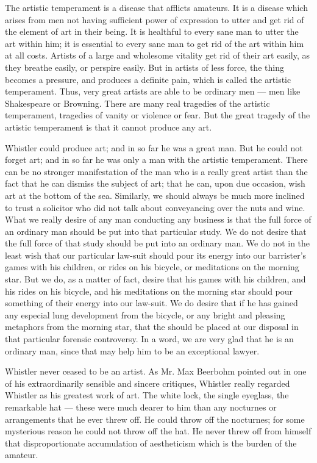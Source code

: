 The artistic temperament is a disease that afflicts amateurs. It is a disease which arises from men not having sufficient power of expression to utter and get rid of the element of art in their being. It is healthful to every sane man to utter the art within him; it is essential to every sane man to get rid of the art within him at all costs. Artists of a large and wholesome vitality get rid of their art easily, as they breathe easily, or perspire easily. But in artists of less force, the thing becomes a pressure, and produces a definite pain, which is called the artistic temperament. Thus, very great artists are able to be ordinary men — men like Shakespeare or Browning. There are many real tragedies of the artistic temperament, tragedies of vanity or violence or fear. But the great tragedy of the artistic temperament is that it cannot produce any art.

Whistler could produce art; and in so far he was a great man. But he could not forget art; and in so far he was only a man with the artistic temperament. There can be no stronger manifestation of the man who is a really great artist than the fact that he can dismiss the subject of art; that he can, upon due occasion, wish art at the bottom of the sea. Similarly, we should always be much more inclined to trust a solicitor who did not talk about conveyancing over the nuts and wine. What we really desire of any man conducting any business is that the full force of an ordinary man should be put into that particular study. We do not desire that the full force of that study should be put into an ordinary man. We do not in the least wish that our particular law-suit should pour its energy into our barrister’s games with his children, or rides on his bicycle, or meditations on the morning star. But we do, as a matter of fact, desire that his games with his children, and his rides on his bicycle, and his meditations on the morning star should pour something of their energy into our law-suit. We do desire that if he has gained any especial lung development from the bicycle, or any bright and pleasing metaphors from the morning star, that the should be placed at our disposal in that particular forensic controversy. In a word, we are very glad that he is an ordinary man, since that may help him to be an exceptional lawyer.

Whistler never ceased to be an artist. As Mr. Max Beerbohm pointed out in one of his extraordinarily sensible and sincere critiques, Whistler really regarded Whistler as his greatest work of art. The white lock, the single eyeglass, the remarkable hat — these were much dearer to him than any nocturnes or arrangements that he ever threw off. He could throw off the nocturnes; for some mysterious reason he could not throw off the hat. He never threw off from himself that disproportionate accumulation of aestheticism which is the burden of the amateur.

